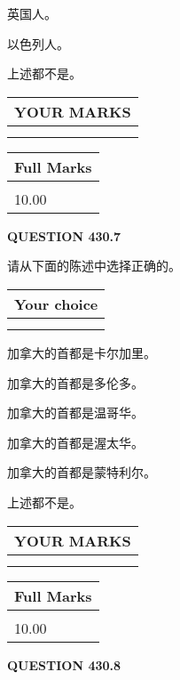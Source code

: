 \documentclass{ctexart}
\begin{document}
 
英国人。
 
 
以色列人。
 
 
 上述都不是。
 
 
  
\vspace{0.2in}
  
\noindent\begin{tabular}{|l|}
\hline
 YOUR MARKS  \\
\hline
 \\ 
 \\ 
\hline
\end{tabular}
\hspace{0.05in} \begin{tabular}{|l|}
\hline
 Full Marks  \\
\hline
 \\ 
10.00 \\
\hline
\end{tabular}
{\textbf{\Large{QUESTION
430.7 
}}}
  
  
请从下面的陈述中选择正确的。
  
  
\noindent\hspace{3.0in} \begin{tabular}{|l|}
\hline
Your choice \\
\hline
 \\ 
 \\ 
\hline
\end{tabular}
  
  
 
 
加拿大的首都是卡尔加里。
 
 
加拿大的首都是多伦多。
 
 
加拿大的首都是温哥华。
 
 
加拿大的首都是渥太华。
 
 
加拿大的首都是蒙特利尔。
 
 
 上述都不是。
 
 
  
\vspace{0.2in}
  
\noindent\begin{tabular}{|l|}
\hline
 YOUR MARKS  \\
\hline
 \\ 
 \\ 
\hline
\end{tabular}
\hspace{0.05in} \begin{tabular}{|l|}
\hline
 Full Marks  \\
\hline
 \\ 
10.00 \\
\hline
\end{tabular}
{\textbf{\Large{QUESTION
430.8 
}}}
  
\end{document}
